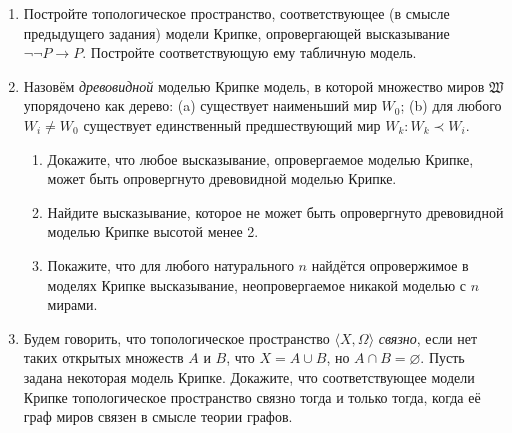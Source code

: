 \begin{enumerate}[wide, labelwidth=!, labelindent=0pt]
    \item Постройте топологическое пространство, соответствующее (в смысле предыдущего задания) модели Крипке, опровергающей
          высказывание $\neg\neg P\rightarrow P$.
          Постройте соответствующую ему табличную модель.

    \item Назовём \emph{древовидной} моделью Крипке модель, в которой множество
          миров $\mathfrak{W}$ упорядочено как дерево: (a) существует наименьший мир
          $W_0$; (b) для любого $W_i \ne W_0$ существует единственный предшествующий мир
          $W_k: W_k \prec W_i$.
          \begin{enumerate}
              \item Докажите, что любое высказывание, опровергаемое моделью Крипке, может
                    быть опровергнуто древовидной моделью Крипке.



              \item Найдите высказывание, которое не может быть опровергнуто древовидной моделью Крипке
                    высотой менее 2.
              \item Покажите, что для любого натурального $n$ найдётся опровержимое в моделях Крипке высказывание,
                    неопровергаемое никакой моделью с $n$ мирами.
          \end{enumerate}

    \item Будем говорить, что топологическое пространство $\langle X, \Omega\rangle$ \emph{связно}, если нет таких
          открытых множеств $A$ и $B$, что $X = A \cup B$, но $A \cap B = \varnothing$. Пусть задана некоторая модель Крипке.
          Докажите, что соответствующее модели Крипке топологическое пространство связно тогда и только тогда, когда её граф
          миров связен в смысле теории графов.


\end{enumerate}
